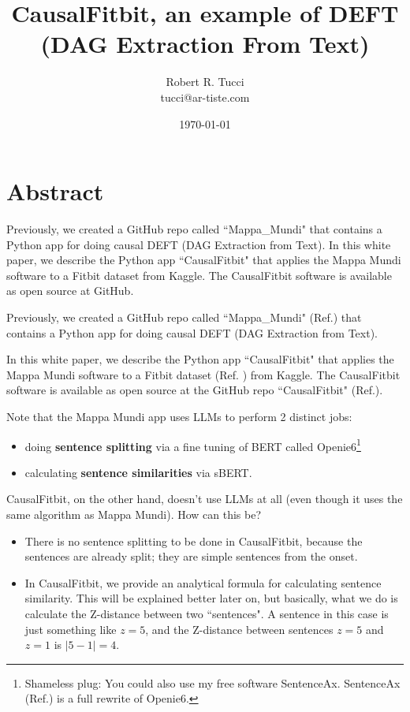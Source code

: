 \documentclass[12pt]{article}
\begin{document}
\title{CausalFitbit, an example of DEFT (DAG Extraction From Text)}
\date{ \today}
\author{Robert R. Tucci\\
        tucci@ar-tiste.com}
\maketitle
\vskip2cm
\section*{Abstract}
Previously,
we created a GitHub repo called  ``Mappa\_Mundi"  that contains a Python app for
doing causal DEFT (DAG Extraction from Text).
In this white paper, we
describe the Python app ``CausalFitbit"
that applies the  Mappa Mundi software  to 
a Fitbit dataset from Kaggle.
The CausalFitbit software 
is available as open source at  GitHub.

\newpage

Previously,
we created a GitHub repo called  ``Mappa\_Mundi" (Ref.\cite{github-mappa-mundi}) that contains a Python app for
doing causal DEFT (DAG Extraction from Text).

In this white paper, we
describe the Python app ``CausalFitbit"
that applies the  Mappa Mundi software  to 
a Fitbit dataset (Ref. \cite{fitbit-dataset}) from Kaggle.
The CausalFitbit software 
is available as open source at the GitHub repo
``CausalFitbit" (Ref.\cite{causal-fitbit}).

Note that the Mappa Mundi app uses LLMs 
to perform 2 distinct jobs: 
\begin{itemize}
\item doing {\bf sentence splitting} via a fine tuning of BERT called Openie6\footnote{Shameless
plug: You could also use my free software SentenceAx. SentenceAx (Ref.\cite{sentence-ax}) is a full rewrite of Openie6.}

\item calculating {\bf sentence similarities} via sBERT.
\end{itemize}

CausalFitbit, on the other hand,
doesn't use LLMs at all (even though it uses the same algorithm as Mappa Mundi). How can this be? 

\begin{itemize}
\item
There is no sentence splitting to be done in CausalFitbit, because the sentences are already split; they are simple sentences from the onset.  
\item In CausalFitbit, we provide an analytical
formula for calculating sentence similarity. This will be explained better later on,
but basically, what we do is 
calculate the Z-distance between two ``sentences". A sentence in this case
is just something like $z=5$,
and the Z-distance between sentences
$z=5$ and $z=1$ is $|5-1|=4$.
\end{itemize} 
\end{document}

